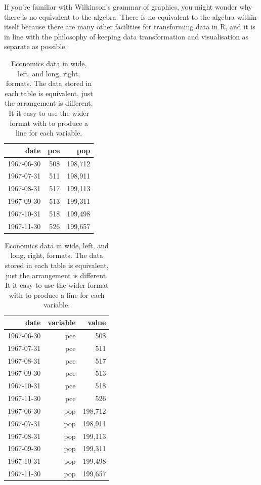 If you're familiar with Wilkinson's grammar of graphics, you might wonder why there is no equivalent to the algebra.  There is no equivalent to the algebra within \ggplot itself because there are many other facilities for transforming data in R, and it is in line with the \ggplot philosophy of keeping data transformation and visualisation as separate as possible.


\begin{table}[ht]
  \centering
  \begin{minipage}[t]{0.4\linewidth}
  \begin{tabular}{rrr}
    \toprule
    date & pce & pop \\
    \midrule
    1967-06-30 & 508 & 198,712 \\
    1967-07-31 & 511 & 198,911 \\
    1967-08-31 & 517 & 199,113 \\
    1967-09-30 & 513 & 199,311 \\
    1967-10-31 & 518 & 199,498 \\
    1967-11-30 & 526 & 199,657 \\
    \bottomrule
  \end{tabular}
  \end{minipage}
  \hspace{0.5cm}
  \begin{minipage}[t]{0.4\linewidth}
  \begin{tabular}{rrr}
    \toprule
    date & variable & value \\
    \midrule
    1967-06-30 & pce &     508 \\
    1967-07-31 & pce &     511 \\
    1967-08-31 & pce &     517 \\
    1967-09-30 & pce &     513 \\
    1967-10-31 & pce &     518 \\
    1967-11-30 & pce &     526 \\
    1967-06-30 & pop & 198,712 \\
    1967-07-31 & pop & 198,911 \\
    1967-08-31 & pop & 199,113 \\
    1967-09-30 & pop & 199,311 \\
    1967-10-31 & pop & 199,498 \\
    1967-11-30 & pop & 199,657 \\
    \midrule
  \end{tabular}
  \end{minipage}

  \caption{Economics data in wide, left, and long, right, formats.  The data stored in each table is equivalent, just the arrangement is different.  It it easy to use the wider format with \ggplot to produce a line for each variable.}
  \label{tbl:melt}
\end{table}


